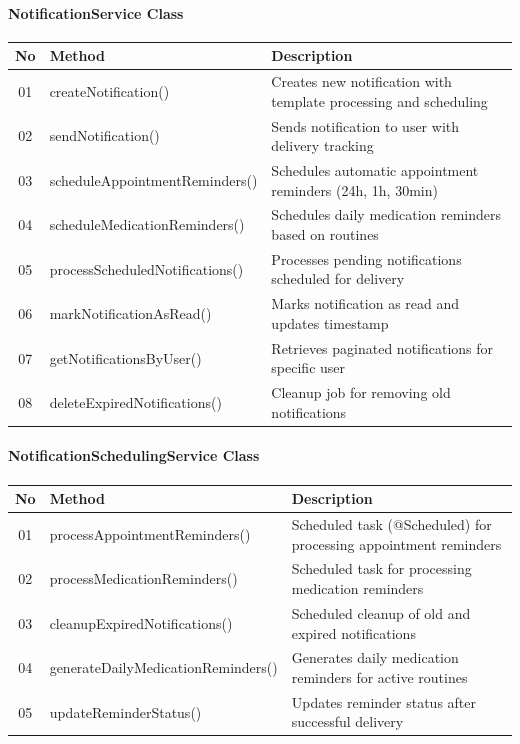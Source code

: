 \documentclass[12pt,a4paper]{article}
\begin{document}
\paragraph{NotificationService Class}
\begin{longtable}{|c|l|p{8cm}|}
\hline
\textbf{No} & \textbf{Method} & \textbf{Description} \\
\hline
01 & createNotification() & Creates new notification with template processing and scheduling \\
\hline
02 & sendNotification() & Sends notification to user with delivery tracking \\
\hline
03 & scheduleAppointmentReminders() & Schedules automatic appointment reminders (24h, 1h, 30min) \\
\hline
04 & scheduleMedicationReminders() & Schedules daily medication reminders based on routines \\
\hline
05 & processScheduledNotifications() & Processes pending notifications scheduled for delivery \\
\hline
06 & markNotificationAsRead() & Marks notification as read and updates timestamp \\
\hline
07 & getNotificationsByUser() & Retrieves paginated notifications for specific user \\
\hline
08 & deleteExpiredNotifications() & Cleanup job for removing old notifications \\
\hline
\end{longtable}

\paragraph{NotificationSchedulingService Class}
\begin{longtable}{|c|l|p{8cm}|}
\hline
\textbf{No} & \textbf{Method} & \textbf{Description} \\
\hline
01 & processAppointmentReminders() & Scheduled task (@Scheduled) for processing appointment reminders \\
\hline
02 & processMedicationReminders() & Scheduled task for processing medication reminders \\
\hline
03 & cleanupExpiredNotifications() & Scheduled cleanup of old and expired notifications \\
\hline
04 & generateDailyMedicationReminders() & Generates daily medication reminders for active routines \\
\hline
05 & updateReminderStatus() & Updates reminder status after successful delivery \\
\hline
\end{longtable}
\end{document}
